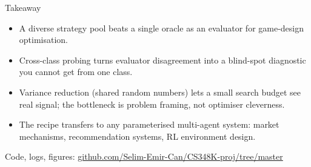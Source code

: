 \documentclass[10pt,aspectratio=169]{beamer}
\begin{document}
\begin{frame}{Takeaway}
  \begin{itemize}\itemsep=0.8em
    \item A diverse strategy pool beats a single oracle as an evaluator for game-design optimisation.
    \item Cross-class probing turns evaluator disagreement into a blind-spot diagnostic you cannot get from one class.
    \item Variance reduction (shared random numbers) lets a small search budget see real signal; the bottleneck is problem framing, not optimiser cleverness.
    \item The recipe transfers to any parameterised multi-agent system: market mechanisms, recommendation systems, RL environment design.
  \end{itemize}
  \vspace{1.0em}
  \begin{center}
    \small Code, logs, figures: \url{github.com/Selim-Emir-Can/CS348K-proj/tree/master}
  \end{center}
\end{frame}
\end{document}

